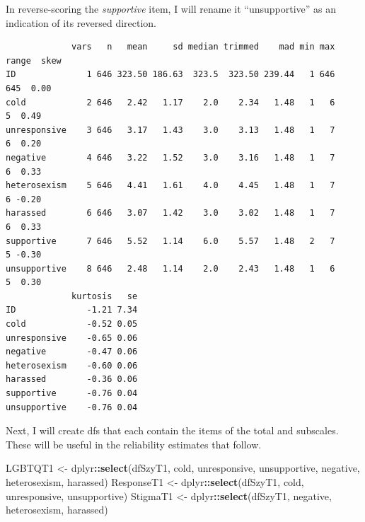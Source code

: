 \documentclass[
  english,
]{book}
\newenvironment{Shaded}{\begin{snugshade}}{\end{snugshade}}
\newcommand{\CommentTok}[1]{\textcolor[rgb]{0.56,0.35,0.01}{\textit{#1}}}
\newcommand{\DataTypeTok}[1]{\textcolor[rgb]{0.13,0.29,0.53}{#1}}
\newcommand{\DecValTok}[1]{\textcolor[rgb]{0.00,0.00,0.81}{#1}}
\newcommand{\KeywordTok}[1]{\textcolor[rgb]{0.13,0.29,0.53}{\textbf{#1}}}
\newcommand{\NormalTok}[1]{#1}
\newcommand{\OperatorTok}[1]{\textcolor[rgb]{0.81,0.36,0.00}{\textbf{#1}}}
\newcommand{\StringTok}[1]{\textcolor[rgb]{0.31,0.60,0.02}{#1}}
\begin{document}
In reverse-scoring the \emph{supportive} item, I will rename it ``unsupportive'' as an indication of its reversed direction.

\begin{Shaded}
\end{Shaded}

\begin{verbatim}
             vars   n   mean     sd median trimmed    mad min max range  skew
ID              1 646 323.50 186.63  323.5  323.50 239.44   1 646   645  0.00
cold            2 646   2.42   1.17    2.0    2.34   1.48   1   6     5  0.49
unresponsive    3 646   3.17   1.43    3.0    3.13   1.48   1   7     6  0.20
negative        4 646   3.22   1.52    3.0    3.16   1.48   1   7     6  0.33
heterosexism    5 646   4.41   1.61    4.0    4.45   1.48   1   7     6 -0.20
harassed        6 646   3.07   1.42    3.0    3.02   1.48   1   7     6  0.33
supportive      7 646   5.52   1.14    6.0    5.57   1.48   2   7     5 -0.30
unsupportive    8 646   2.48   1.14    2.0    2.43   1.48   1   6     5  0.30
             kurtosis   se
ID              -1.21 7.34
cold            -0.52 0.05
unresponsive    -0.65 0.06
negative        -0.47 0.06
heterosexism    -0.60 0.06
harassed        -0.36 0.06
supportive      -0.76 0.04
unsupportive    -0.76 0.04
\end{verbatim}

Next, I will create dfs that each contain the items of the total and subscales. These will be useful in the reliability estimates that follow.

\begin{Shaded}
\begin{Highlighting}[]
\NormalTok{LGBTQT1 <-}\StringTok{ }\NormalTok{dplyr}\OperatorTok{::}\KeywordTok{select}\NormalTok{(dfSzyT1, cold, unresponsive, unsupportive, negative, heterosexism, harassed)}
\NormalTok{ResponseT1 <-}\StringTok{ }\NormalTok{dplyr}\OperatorTok{::}\KeywordTok{select}\NormalTok{(dfSzyT1, cold, unresponsive, unsupportive)}
\NormalTok{StigmaT1 <-}\StringTok{ }\NormalTok{dplyr}\OperatorTok{::}\KeywordTok{select}\NormalTok{(dfSzyT1, negative, heterosexism, harassed)}
\end{Highlighting}
\end{Shaded}
\end{document}
